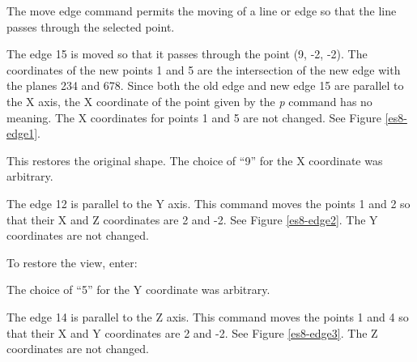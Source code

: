 The move edge command permits the moving of a line or edge so that the
line passes through the selected point.


The edge 15 is moved so that it passes through the point (9, -2, -2).  The
coordinates of the new points 1 and 5 are the intersection of the new edge
with the planes 234 and 678.  Since both the old edge and new edge 15 are
parallel to the X axis,
the X coordinate of the point given by the {\em p} command
has no meaning.  The X coordinates for points 1 and 5 are not changed.
See Figure \ref{es8-edge1}.


This restores the original shape.
The choice of ``9'' for the X coordinate was arbitrary.


The edge 12 is parallel to the Y axis.  This command moves the points 1
and 2 so that their X and Z coordinates are 2 and -2.
See Figure \ref{es8-edge2}.
The Y coordinates are not changed.

To restore the view, enter:


The choice of ``5'' for the Y coordinate was arbitrary.


The edge 14 is parallel to the Z axis.
This command moves the points 1
and 4 so that their X and Y coordinates are 2 and -2.
See Figure \ref{es8-edge3}.
The Z coordinates are not changed.


